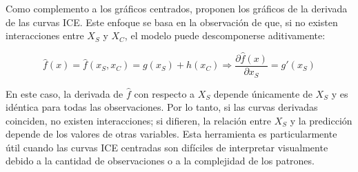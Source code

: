 Como complemento a los gráficos centrados, \cite{Goldstein2015} proponen los gráficos de la derivada de las curvas ICE. Este enfoque se basa en la observación de que, si no existen interacciones entre $X_S$ y $X_C$, el modelo puede descomponerse aditivamente:

\begin{equation}
\hat{f}(x)=\hat{f}(x_S,x_C)=g(x_S)+h(x_C) \Rightarrow \frac{\partial \hat{f}(x)}{\partial x_S}=g'(x_S)    
\end{equation}

En este caso, la derivada de $\hat{f}$ con respecto a $X_S$ depende únicamente de $X_S$ y es idéntica para todas las observaciones. Por lo tanto, si las curvas derivadas coinciden, no existen interacciones; si difieren, la relación entre $X_S$ y la predicción depende de los valores de otras variables. Esta herramienta es particularmente útil cuando las curvas ICE centradas son difíciles de interpretar visualmente debido a la cantidad de observaciones o a la complejidad de los patrones.
